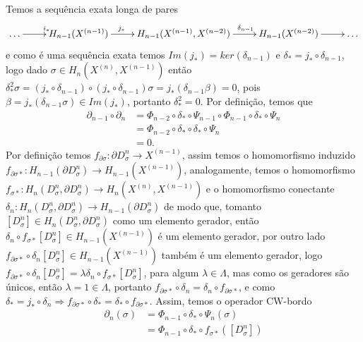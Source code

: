 \documentclass[12pt]{book}
\newcommand{\celula}[2]{D^{#1}_{#2}}
\newcommand{\celulafront}[2]{\partial D^{#1}_{#2}}
\newcommand{\skeleton}[1]{X^{(#1)}}
\newcommand{\homologia}[2]{H_{#1}(#2)}
\newcommand{\homologiarel}[3]{H_{#1}(#2,#3)}
\newcommand{\homologiarelcel}[3]{H_{#1}(D^{#2}_{#3}, \partial D^{#2}_{#3})}
\newcommand{\homologiarelskelesimpl}[2]{H_{#1}(X^{(#2)}, X^{(#2-1)})}
\begin{document}
{	 Temos a sequência exata longa de pares
	\[
	\xymatrix{
		\dots \ar[r]^{i_{*}} &
		\homologia{n-1}{\skeleton{n-1}}\ar[r]^{j_{*}\qquad} &
		\homologiarel{n-1}{\skeleton{n-1}}{\skeleton{n-2}} \ar[r]^{\qquad \delta_{n-1}}&
		\homologia{n-1}{\skeleton{n-2}} \ar[r] & \dots
	}
	\]	
	e como é uma sequência exata temos $Im(j_{*})=ker(\delta_{n-1})$ e $\delta_{*} = j_{*}\circ \delta_{n-1}$, logo dado $\sigma \in \homologiarelskelesimpl{n}{n}$ então $\delta_{*}^{2}\sigma = (j_{*}\circ \delta_{n-1})\circ(j_{*}\circ \delta_{n-1})\sigma = j_{*}( \delta_{n-1}\beta) = 0$, pois $\beta = j_{*}(\delta_{n-1}\sigma) \in Im(j_{*})$, portanto $\delta_{*}^{2} = 0$. Por definição, temos que 
	$$
	\begin{aligned}
		\partial_{n-1}\circ \partial_{n} 
		&= \Phi_{n-2} \circ \delta_{*} \circ \Psi_{n-1} \circ \Phi_{n-1} \circ \delta_{*} \circ \Psi_{n}
		\\
		&=\Phi_{n-2} \circ \delta_{*} \circ  \delta_{*} \circ \Psi_{n}
		\\
		&=0.
	\end{aligned}
	$$
	Por definição temos $f_{\partial\sigma}: \celulafront{n}{\sigma} \to \skeleton{n-1}$, assim temos o homomorfismo induzido $f_{\partial\sigma*}: \homologia{n-1}{\celulafront{n}{\sigma} }\to \homologia{n-1}{\skeleton{n-1}}$, analogamente, temos o homomorfismo $f_{\sigma*}:\homologiarelcel{n}{n}{\sigma} \to \homologiarelskelesimpl{n}{n}$ e o homomorfismo conectante $\delta_{n} : \homologiarelcel{n}{n}{\sigma} \to \homologia{n-1}{\celulafront{n}{\sigma}}$ de modo que, tomanto $[\celula{n}{\sigma}] \in \homologiarelcel{n}{n}{\sigma}$ como um elemento gerador, então $\delta_{n}\circ f_{\sigma*}[\celula{n}{\sigma}] \in \homologia{n-1}{\skeleton{n-1}}$ é um elemento gerador, por outro lado $f_{\partial\sigma*}\circ \delta_{n}[\celula{n}{\sigma}] \in \homologia{n-1}{\skeleton{n-1}}$ também é um elemento gerador, logo $f_{\partial\sigma*}\circ \delta_{n}[\celula{n}{\sigma}] = \lambda \delta_{n}\circ f_{\sigma*}[\celula{n}{\sigma}]$, para algum $\lambda \in \Lambda$, mas como os geradores são únicos, então $\lambda = 1 \in \Lambda$, portanto $f_{\partial\sigma*}\circ \delta_{n} = \delta_{n}\circ f_{\partial\sigma*}$, e como $\delta_{*} = j_{*}\circ\delta_{n} \Rightarrow f_{\partial\sigma*}\circ \delta_{*} = \delta_{*}\circ f_{\partial\sigma*}$. Assim, temos o operador CW-bordo
	$$
	\begin{aligned}
	\partial_{n}(\sigma) &= \Phi_{n-1}\circ\delta_{*}\circ\Psi_{n}(\sigma)
	\\
	&= \Phi_{n-1}\circ\delta_{*}\circ f_{\sigma*}([\celula{n}{\sigma}])

\end{aligned}$$}
\end{document}
